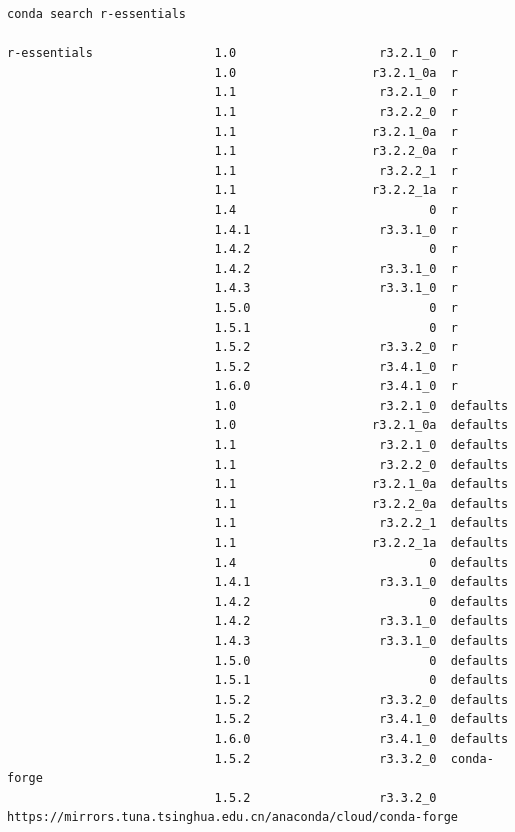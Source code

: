 \documentclass[]{article}
\numberwithin{figure}{section}
\numberwithin{table}{section}
\begin{document}
\begin{verbatim}
conda search r-essentials

r-essentials                 1.0                    r3.2.1_0  r               
                             1.0                   r3.2.1_0a  r               
                             1.1                    r3.2.1_0  r               
                             1.1                    r3.2.2_0  r               
                             1.1                   r3.2.1_0a  r               
                             1.1                   r3.2.2_0a  r               
                             1.1                    r3.2.2_1  r               
                             1.1                   r3.2.2_1a  r               
                             1.4                           0  r               
                             1.4.1                  r3.3.1_0  r               
                             1.4.2                         0  r               
                             1.4.2                  r3.3.1_0  r               
                             1.4.3                  r3.3.1_0  r               
                             1.5.0                         0  r               
                             1.5.1                         0  r               
                             1.5.2                  r3.3.2_0  r               
                             1.5.2                  r3.4.1_0  r               
                             1.6.0                  r3.4.1_0  r               
                             1.0                    r3.2.1_0  defaults        
                             1.0                   r3.2.1_0a  defaults        
                             1.1                    r3.2.1_0  defaults        
                             1.1                    r3.2.2_0  defaults        
                             1.1                   r3.2.1_0a  defaults        
                             1.1                   r3.2.2_0a  defaults        
                             1.1                    r3.2.2_1  defaults        
                             1.1                   r3.2.2_1a  defaults        
                             1.4                           0  defaults        
                             1.4.1                  r3.3.1_0  defaults        
                             1.4.2                         0  defaults        
                             1.4.2                  r3.3.1_0  defaults        
                             1.4.3                  r3.3.1_0  defaults        
                             1.5.0                         0  defaults        
                             1.5.1                         0  defaults        
                             1.5.2                  r3.3.2_0  defaults        
                             1.5.2                  r3.4.1_0  defaults        
                             1.6.0                  r3.4.1_0  defaults        
                             1.5.2                  r3.3.2_0  conda-forge     
                             1.5.2                  r3.3.2_0  https://mirrors.tuna.tsinghua.edu.cn/anaconda/cloud/conda-forge 
\end{verbatim}
\end{document}
